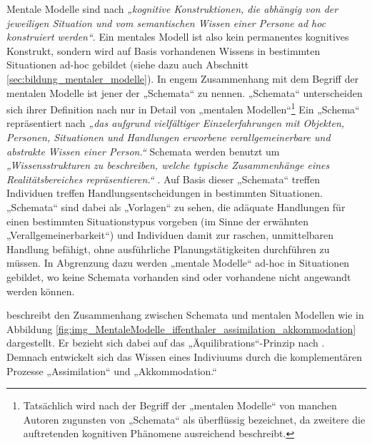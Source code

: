 Mentale Modelle sind nach \citet[][S. 7]{Ifenthaler06} \emph{„kognitive Konstruktionen, die abhängig von der jeweiligen Situation und vom semantischen Wissen einer Persone ad hoc konstruiert werden“}. Ein mentales Modell ist also kein permanentes kognitives Konstrukt, sondern wird auf Basis vorhandenen Wissens in bestimmten Situationen ad-hoc gebildet (siehe dazu auch Abschnitt \ref{sec:bildung_mentaler_modelle}). In engem Zusammenhang mit dem Begriff der mentalen Modelle ist jener der „Schemata“ zu nennen. „Schemata“ unterscheiden sich ihrer Definition nach nur in Detail von „mentalen Modellen“\footnote{Tatsächlich wird nach \citet{Ifenthaler06} der Begriff der „mentalen Modelle“ von manchen Autoren zugunsten von „Schemata“ als überflüssig bezeichnet, da zweitere die auftretenden kognitiven Phänomene ausreichend beschreibt.} Ein „Schema“ repräsentiert nach \citet[][S. 57]{Seel03a} \emph{„das aufgrund vielfältiger Einzelerfahrungen mit Objekten, Personen, Situationen und Handlungen erworbene verallgemeinerbare und abstrakte Wissen einer Person.“} Schemata werden benutzt um \emph{„Wissensstrukturen zu beschreiben, welche typische Zusammenhänge eines Realitätsbereiches repräsentieren.“} \citep[][S. 8]{Ifenthaler06}. Auf Basis dieser „Schemata“ treffen Individuen treffen Handlungsentscheidungen in bestimmten Situationen. „Schemata“ sind dabei als „Vorlagen“ zu sehen, die adäquate Handlungen für einen bestimmten Situationstypus vorgeben (im Sinne der erwähnten „Verallgemeinerbarkeit“) und Individuen damit zur raschen, unmittelbaren Handlung befähigt, ohne ausführliche Planungstätigkeiten durchführen zu müssen. In Abgrenzung dazu werden „mentale Modelle“ ad-hoc in Situationen gebildet, wo keine Schemata vorhanden sind oder vorhandene nicht angewandt werden können. 

\citet{Ifenthaler06} beschreibt den Zusammenhang zwischen Schemata und mentalen Modellen wie in Abbildung \ref{fig:img_MentaleModelle_iffenthaler_assimilation_akkommodation} dargestellt. Er bezieht sich dabei auf das „Äquilibrations“-Prinzip nach \citet{Piaget76}. Demnach entwickelt sich das Wissen eines Indiviuums durch die komplementären Prozesse „Assimilation“ und „Akkommodation.“


